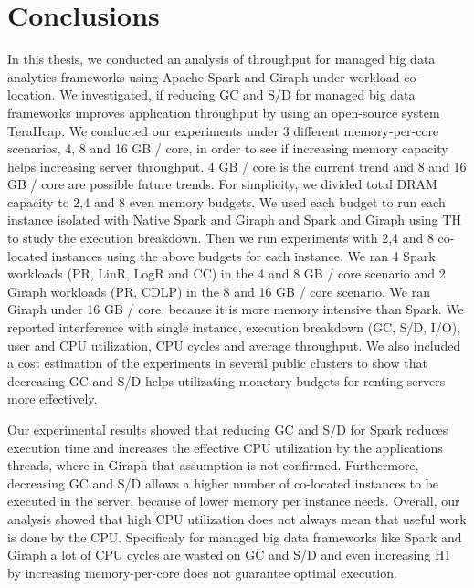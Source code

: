 \section{Conclusions}

In this thesis, we conducted an analysis of throughput for managed big data analytics frameworks
using Apache Spark and Giraph under workload co-location. We investigated, if reducing GC and S/D for managed big data frameworks improves application throughput by using an open-source system TeraHeap. We conducted our experiments under 3 different memory-per-core
scenarios, 4, 8 and 16 GB / core, in order to see if increasing memory capacity helps increasing server throughput. 4 GB / core is the current trend and 8 and 16 GB / core are possible future trends.
For simplicity, we divided total DRAM capacity to 2,4 and 8 even memory budgets. We used each budget to run each instance isolated with Native Spark and Giraph and Spark and Giraph using TH to study the execution breakdown.
Then we run experiments with 2,4 and 8 co-located instances using the above budgets for each instance. We ran 4 Spark workloads (PR, LinR, LogR and CC) in the 4 and 8 GB / core scenario and 2 Giraph workloads (PR, CDLP) in the 8 and 16 GB / core scenario. We ran Giraph under 16 GB / core, because it is more memory intensive than Spark. We reported interference with single instance, execution breakdown (GC, S/D, I/O), user and CPU utilization, CPU cycles and average throughput. We also included a cost estimation of the experiments in several public clusters to show that decreasing GC and S/D helps utilizating monetary budgets for renting servers more effectively.

Our experimental results showed that reducing GC and S/D for Spark reduces execution time and increases the effective CPU utilization by the applications threads, where in Giraph that assumption is not confirmed. Furthermore, decreasing GC and S/D allows a higher number of co-located instances to be executed in the server, because of lower memory per instance needs. Overall, our analysis showed that high CPU utilization does not always mean that useful work is done by the CPU. Specificaly for managed
big data frameworks like Spark and Giraph a lot of CPU cycles are wasted on GC and S/D and even increasing H1 by increasing memory-per-core does not guarantee optimal execution.

